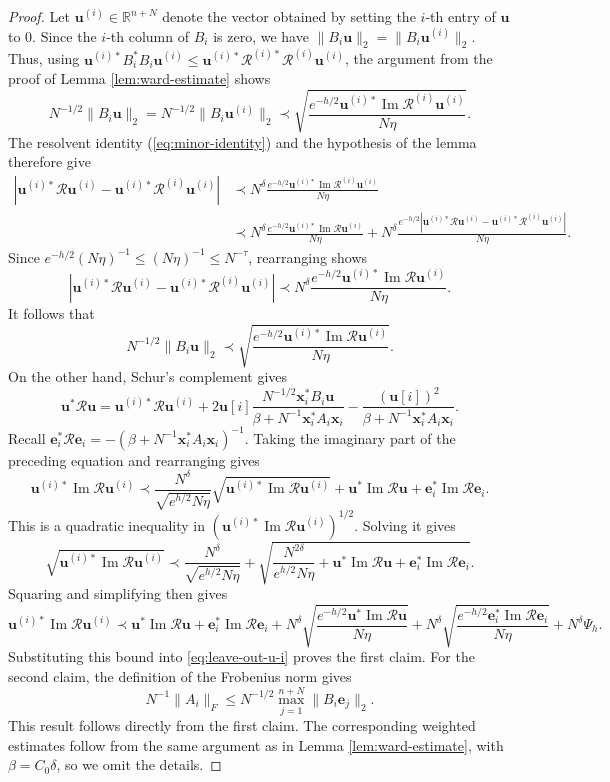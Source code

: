 \documentclass[11pt,reqno]{amsart}
\def\R{\mathbb{R}}
\def\e{\mathbf{e}}
\def\u{\mathbf{u}}
\def\x{\mathbf{x}}
\def\cR{\mathcal{R}}
\def\Im{\operatorname{Im}}
\theoremstyle{definition}
\numberwithin{equation}{section}
\numberwithin{figure}{section}
\begin{document}
\begin{proof}
Let $\u^{(i)}\in\R^{n+N}$ denote the vector obtained by setting the $i$-th entry of $\u$ to $0$. Since the $i$-th column of $B_i$ is zero, we have $\|B_i\u\|_2=\|B_i\u^{(i)}\|_2$. Thus, using $\u^{(i)*}B_i^*B_i\u^{(i)}\leq \u^{(i)*}\cR^{(i)*}\cR^{(i)}\u^{(i)}$, the argument from the proof of Lemma \ref{lem:ward-estimate} shows
\[
    N^{-1/2}\|B_i\u\|_2=N^{-1/2}\|B_i\u^{(i)}\|_2\prec\sqrt{\frac{e^{-h/2}\u^{(i)*}\Im\cR^{(i)}\u^{(i)}}{N\eta}}.
\]
The resolvent identity (\ref{eq:minor-identity}) and the hypothesis of the lemma therefore give
\begin{align*}
    |\u^{(i)*}\cR\u^{(i)}-\u^{(i)*}\cR^{(i)}\u^{(i)}|&\prec N^\delta\frac{e^{-h/2}\u^{(i)*}\Im\cR^{(i)}\u^{(i)}}{N\eta}\\
    &\prec N^\delta\frac{e^{-h/2}\u^{(i)*}\Im\cR\u^{(i)}}{N\eta}+N^\delta\frac{e^{-h/2}|\u^{(i)*}\cR\u^{(i)}-\u^{(i)*}\cR^{(i)}\u^{(i)}|}{N\eta}.
\end{align*}
Since $e^{-h/2}(N\eta)^{-1}\leq (N\eta)^{-1}\leq N^{-\tau}$, rearranging shows
\[
    |\u^{(i)*}\cR\u^{(i)}-\u^{(i)*}\cR^{(i)}\u^{(i)}|\prec N^\delta\frac{e^{-h/2}\u^{(i)*}\Im\cR\u^{(i)}}{N\eta}.
\]
It follows that
\begin{equation}\label{eq:leave-out-u-i}
    N^{-1/2}\|B_i\u\|_2\prec\sqrt{\frac{e^{-h/2}\u^{(i)*}\Im\cR\u^{(i)}}{N\eta}}.
\end{equation}
On the other hand, Schur's complement gives
\[
    \u^*\cR\u=\u^{(i)*}\cR\u^{(i)}+2\u[i]\frac{N^{-1/2}\x_i^*B_i\u}{\beta+N^{-1}\x_i^*A_i\x_i}-\frac{(\u[i])^2}{\beta+N^{-1}\x_i^*A_i\x_i}.
\]
Recall $\e_i^*\cR\e_i=-(\beta+N^{-1}\x_i^* A_i\x_i)^{-1}$. Taking the imaginary part of the preceding equation and rearranging gives
\[
    \u^{(i)*}\Im\cR\u^{(i)}\prec \frac{N^\delta}{\sqrt{e^{h/2}N\eta}}\sqrt{\u^{(i)*}\Im\cR\u^{(i)}}+\u^*\Im\cR\u+\e_i^*\Im\cR\e_i . 
\]
This is a quadratic inequality in $(\u^{(i)*}\Im\cR\u^{(i)})^{1/2}$. Solving it gives
\[
    \sqrt{\u^{(i)*}\Im\cR\u^{(i)}}\prec\frac{N^\delta}{\sqrt{e^{h/2}N\eta}}+\sqrt{\frac{N^{2\delta}}{e^{h/2}N\eta}+\u^*\Im\cR\u+\e_i^*\Im\cR\e_i} .
\]
Squaring and simplifying then gives
\[
    \u^{(i)*}\Im\cR\u^{(i)}\prec \u^*\Im\cR\u+\e_i^*\Im\cR\e_i+ N^\delta\sqrt{\frac{e^{-h/2}\u^*\Im\cR\u}{N\eta}}+N^\delta\sqrt{\frac{e^{-h/2}\e_i^*\Im\cR\e_i}{N\eta}}+N^\delta\Psi_h.
\]
Substituting this bound into \eqref{eq:leave-out-u-i} proves the first claim. For the second claim, the definition of the Frobenius norm gives
\[
    N^{-1}\|A_i\|_F\leq N^{-1/2}\max_{j=1}^{n+N}\|B_i\e_j\|_2 . 
\]
This result follows directly from the first claim. The corresponding weighted estimates follow from the same argument as in Lemma \ref{lem:ward-estimate}, with $\beta=C_0\delta$, so we omit the details.
\end{proof}
\end{document}
